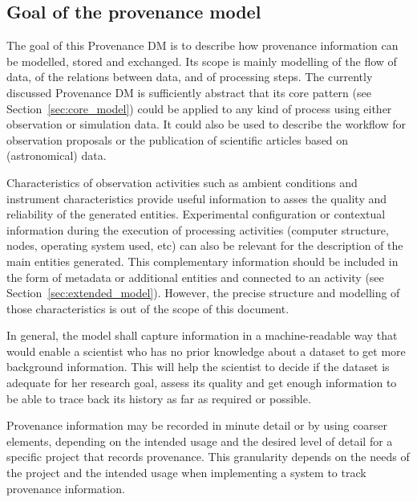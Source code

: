 

\subsection{Goal of the provenance model}
\label{sec:goals}

The goal of this Provenance DM is to describe how provenance information
can be modelled, stored and exchanged. Its scope
is mainly modelling of the flow of data, of the relations between data,
and of processing steps. The currently discussed Provenance DM is sufficiently abstract that its core pattern (see Section~\ref{sec:core_model}) could be applied to any kind of process using either observation or simulation data.
It could also be used to describe the workflow for observation proposals or the publication of scientific articles based on (astronomical) data.

Characteristics of observation activities such as ambient conditions and
instrument characteristics provide useful information to asses the quality and reliability of the generated entities. 
Experimental configuration or contextual information during
the execution of processing activities (computer structure, nodes, operating
system used, etc) can also be relevant for the description of the main entities generated. This complementary information should be included in the form of metadata or additional entities and connected to an activity (see Section~\ref{sec:extended_model}). However, the precise structure and modelling of those characteristics is out of the scope of this document. 

In general, the model shall capture information in a machine-readable way that would enable a scientist who has no prior knowledge about a dataset to get more background information. 
This will help the scientist to decide if the dataset 
is adequate for her research goal, assess its quality and get enough information
to be able to trace back its history as far as required or possible. 

Provenance information may be recorded in minute detail or by using coarser
elements, depending on the intended usage and the desired level of detail
for a specific project that records provenance. 
This granularity depends on the needs of the project and the intended usage when implementing a system to track provenance information.

